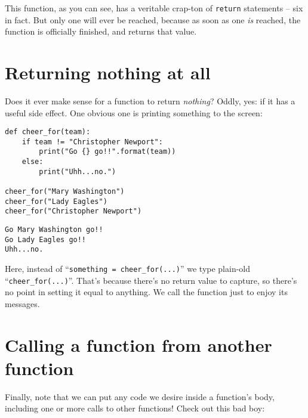This function, as you can see, has a veritable crap-ton of \texttt{return}
statements -- six in fact. But only one will ever be reached, because as soon
as one \textit{is} reached, the function is officially finished, and returns
that value.

\section{Returning nothing at all}

Does it ever make sense for a function to return \textit{nothing}? Oddly, yes:
if it has a useful side effect. One obvious one is printing something to the
screen:

\begin{Verbatim}[fontsize=\small,samepage=true,frame=single,framesep=3mm]
def cheer_for(team):
    if team != "Christopher Newport":
        print("Go {} go!!".format(team))
    else:
        print("Uhh...no.")

cheer_for("Mary Washington")
cheer_for("Lady Eagles")
cheer_for("Christopher Newport")
\end{Verbatim}
\vspace{-.5in}

\begin{Verbatim}[fontsize=\small,samepage=true,frame=leftline,framesep=5mm,framerule=1mm]
Go Mary Washington go!!
Go Lady Eagles go!!
Uhh...no.
\end{Verbatim}

Here, instead of ``\texttt{something = cheer\_for(...)}'' we type plain-old
``\texttt{cheer\_for(...)}''. That's because there's no return value to
capture, so there's no point in setting it equal to anything. We call the
function just to enjoy its messages.

\bigskip

\section{Calling a function from another function}

Finally, note that we can put any code we desire inside a function's body,
including one or more calls to other functions! Check out this bad boy:


